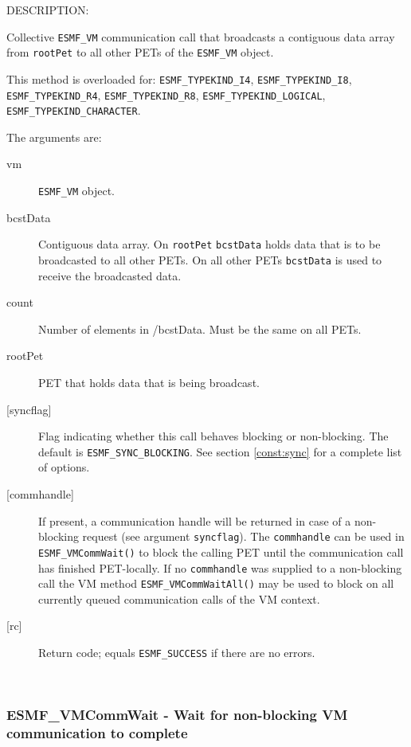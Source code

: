 {\sf DESCRIPTION:\\ }


     Collective {\tt ESMF\_VM} communication call that broadcasts a contiguous 
     data array from {\tt rootPet} to all other PETs of the {\tt ESMF\_VM}
     object.
  
     This method is overloaded for:
     {\tt ESMF\_TYPEKIND\_I4}, {\tt ESMF\_TYPEKIND\_I8},
     {\tt ESMF\_TYPEKIND\_R4}, {\tt ESMF\_TYPEKIND\_R8}, 
     {\tt ESMF\_TYPEKIND\_LOGICAL}, 
     {\tt ESMF\_TYPEKIND\_CHARACTER}.
  
     The arguments are:
     \begin{description}
     \item[vm] 
          {\tt ESMF\_VM} object.
     \item[bcstData]
          Contiguous data array. On {\tt rootPet} {\tt bcstData} holds data that
          is to be broadcasted to all other PETs. On all other PETs 
          {\tt bcstData} is used to receive the broadcasted data.
     \item[count] 
          Number of elements in {/bcstData}. Must be the same on all PETs.
     \item[rootPet] 
          PET that holds data that is being broadcast.
     \item[{[syncflag]}]
          Flag indicating whether this call behaves blocking or non-blocking.
          The default is {\tt ESMF\_SYNC\_BLOCKING}. See section
          \ref{const:sync} for a complete list of options.
     \item[{[commhandle]}]
          If present, a communication handle will be returned in case of a 
          non-blocking request (see argument {\tt syncflag}). The
          {\tt commhandle} can be used in {\tt ESMF\_VMCommWait()} to block the
          calling PET until the communication call has finished PET-locally. If
          no {\tt commhandle} was supplied to a non-blocking call the VM method
          {\tt ESMF\_VMCommWaitAll()} may be used to block on all currently queued
          communication calls of the VM context.
     \item[{[rc]}] 
          Return code; equals {\tt ESMF\_SUCCESS} if there are no errors.
     \end{description}
   
 
\mbox{}\hrulefill\ 
 
\subsubsection [ESMF\_VMCommWait] {ESMF\_VMCommWait - Wait for non-blocking VM communication to complete}


